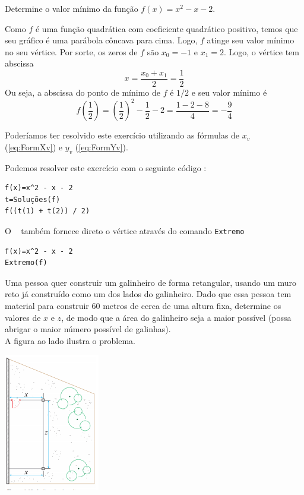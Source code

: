 \documentclass[../main.tex]{subfiles}
\begin{document}
\begin{exeresol}\label{Exer:ExercConcav}
  Determine o valor mínimo da função $f(x) = x^2 - x - 2$.
  \begin{resol}
  Como $f$ é uma função quadrática com coeficiente quadrático positivo, temos que seu gráfico é uma parábola côncava para cima. Logo, $f$ atinge seu valor mínimo no seu vértice. Por sorte, os zeros de $f$ são $x_0 = -1$ e $x_1 = 2$. Logo, o vértice tem abscissa
  \begin{equation*}
    x = \frac{x_0 + x_1}{2} = \frac{1}{2}
  \end{equation*}
  Ou seja, a abscissa do ponto de mínimo de $f$ é $1/2$ e seu valor mínimo é
  \begin{equation*}
    f\left(\frac{1}{2}\right) = \left(\frac{1}{2}\right)^2-\frac{1}{2}-2 = \frac{1-2-8}{4} = -\frac{9}{4}
  \end{equation*}
\begin{obs}
  Poderíamos ter resolvido este exercício utilizando as fórmulas de $x_v$ (\ref{eq:FormXv}) e  $y_v$ (\ref{eq:FormYv}).
\end{obs}
  Podemos resolver este exercício com o seguinte código \geogebra:
\begin{verbatim}
f(x)=x^2 - x - 2
t=Soluções(f)
f((t(1) + t(2)) / 2)
\end{verbatim}

O \geogebra~ também fornece direto o vértice através do comando \verb+Extremo+
\begin{verbatim}
f(x)=x^2 - x - 2
Extremo(f)
\end{verbatim}
\end{resol}
\end{exeresol}

\begin{minipage}{0.68\linewidth}
\begin{exeresol}
 Uma pessoa quer construir um galinheiro de forma retangular,
 usando um muro reto já construído como um dos lados do galinheiro.
 Dado que essa pessoa tem material para construir 60 metros de cerca de 
uma altura fixa,  determine os valores de $x$ e $z$,  de modo que a área do galinheiro seja a maior possível (possa abrigar o maior número possível de galinhas).\\
A figura ao lado ilustra o problema.
\end{exeresol}
\end{minipage}\hfill
\begin{minipage}{0.26\linewidth}
\includegraphics[scale=0.8]{1-cap_func/fig_func/Galinheiro}
\end{minipage}
\end{document}
